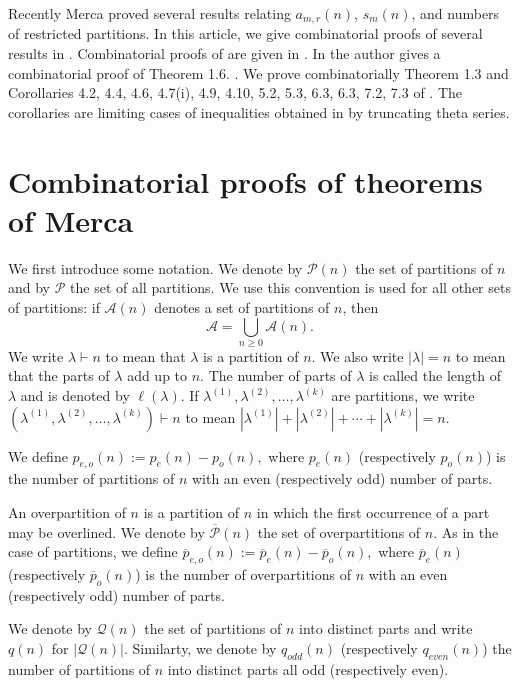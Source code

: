\documentclass{amsart}
\theoremstyle{definition}
\begin{document}
Recently Merca \cite{M23} proved several results relating $a_{m,r}(n)$, $s_m(n)$, and numbers of restricted partitions. In this article, we give combinatorial proofs of several  results in \cite{M23}. Combinatorial proofs of \cite[Theorem 1.3 and Corollary 1.4]{M23} are given in \cite{MS}. In \cite{M23} the author gives  a combinatorial proof of Theorem 1.6. . 
We prove combinatorially Theorem 1.3 and Corollaries 4.2, 4.4, 4.6, 4.7(i), 4.9, 4.10, 5.2, 5.3, 6.3, 6.3, 7.2, 7.3 of \cite{M23}. The corollaries are limiting cases of inequalities obtained in \cite{M23} by truncating theta series. 






\section{Combinatorial proofs of theorems of Merca}

We first introduce some notation. 
We denote by $\mathcal P(n)$ the set of partitions of $n$ and by $\mathcal P$ the set of all partitions. We use this convention is used for all other sets of partitions: if $\mathcal A(n)$ denotes a set of partitions of $n$, then $$\mathcal A=\bigcup_{n\geq0}\mathcal A(n).$$ We write $\lambda\vdash n$ to mean that $\lambda$ is a partition of $n$. We also write $|\lambda|=n$ to mean that the parts of $\lambda$ add up to $n$. The number of parts of $\lambda$ is called the length of $\lambda$ and is denoted by $\ell(\lambda)$. If $\lambda^{(1)}, \lambda^{(2)}, \ldots, \lambda^{(k)}$ are partitions, we  write $(\lambda^{(1)}, \lambda^{(2)}, \ldots, \lambda^{(k)})\vdash n$ to mean $|\lambda^{(1)}|+ |\lambda^{(2)}|+ \cdots +|\lambda^{(k)}|=n$. 

We define $p_{e,o}(n):=p_e(n)-p_o(n),$ where $p_e(n)$ (respectively $p_o(n)$) is the number of partitions of $n$ with an even (respectively odd) number of parts. 

An overpartition of $n$ is a partition of $n$ in which the first occurrence of a part may be overlined. We denote by $\overline{\mathcal P}(n)$ the set of overpartitions of $n$. As in the case of partitions, we define $\overline p_{e,o}(n):=\overline p_e(n)-\overline p_o(n),$ where $\overline p_e(n)$ (respectively $\overline p_o(n)$) is the number of overpartitions of $n$ with an even (respectively odd) number of parts. 

We denote by $\mathcal Q(n)$ the set of partitions of $n$ into distinct parts and write $q(n)$ for $|\mathcal Q(n)|$. Similarty, we denote by $q_{odd}(n)$ (respectively $q_{even}(n)$) the number of partitions of $n$ into distinct parts all odd (respectively even). 
\end{document}

